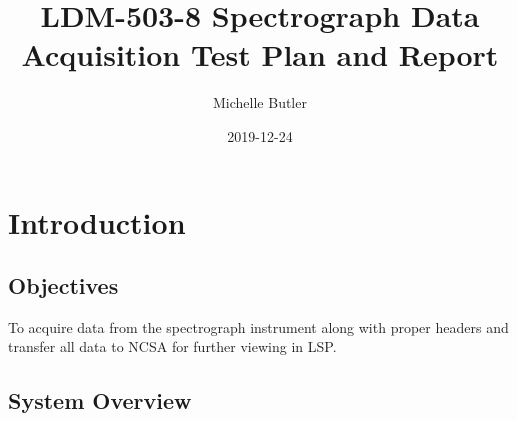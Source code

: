\documentclass[DM,STR,toc]{lsstdoc}
\begin{document}
\def\milestoneName{Spectrograph Data Acquisition}
\def\milestoneId{LDM-503-8}
\def\product{Data Management}


\title{ LDM-503-8 Spectrograph Data Acquisition Test Plan and Report}
\setDocRef{\lsstDocType-\lsstDocNum}
\date{2019-12-24}
\author{ Michelle Butler }






\maketitle

\section{Introduction}
\label{sect:intro}


\subsection{Objectives}
\label{sect:objectives}

To acquire data from the spectrograph instrument along with proper
headers and transfer all data to NCSA for further viewing in LSP. ~



\subsection{System Overview}
\label{sect:systemoverview}
\end{document}
